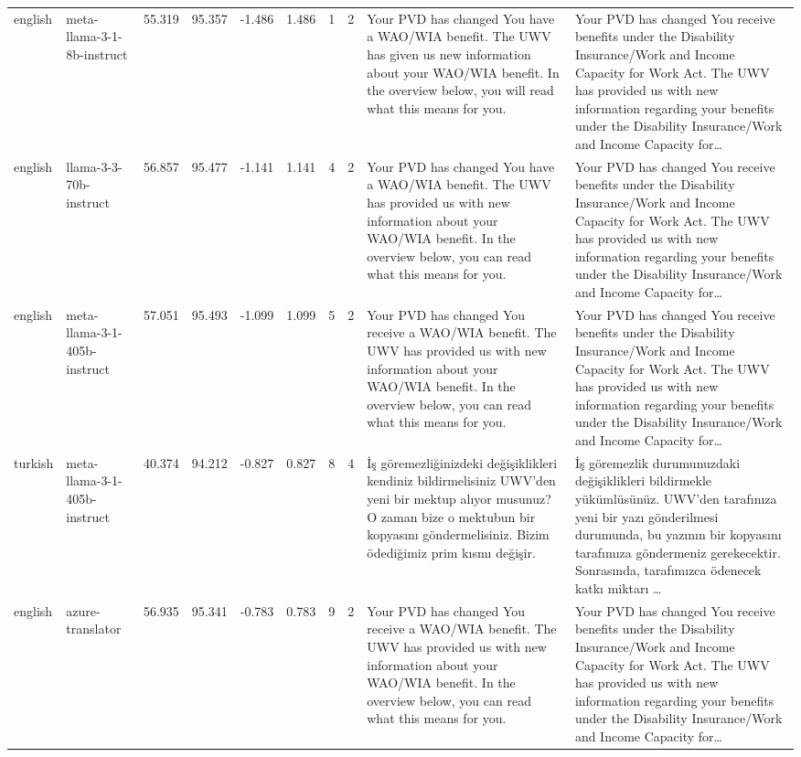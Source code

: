 \begin{tabular}{llrrrrrrll}
english & meta-llama-3-1-8b-instruct & 55.319 & 95.357 & -1.486 & 1.486 & 1 & 2 & Your PVD has changed You have a WAO/WIA benefit. The UWV has given us new information about your WAO/WIA benefit. In the overview below, you will read what this means for you. & Your PVD has changed You receive benefits under the Disability Insurance/Work and Income Capacity for Work Act. The UWV has provided us with new information regarding your benefits under the Disability Insurance/Work and Income Capacity for… \\
english & llama-3-3-70b-instruct & 56.857 & 95.477 & -1.141 & 1.141 & 4 & 2 & Your PVD has changed You have a WAO/WIA benefit. The UWV has provided us with new information about your WAO/WIA benefit. In the overview below, you can read what this means for you. & Your PVD has changed You receive benefits under the Disability Insurance/Work and Income Capacity for Work Act. The UWV has provided us with new information regarding your benefits under the Disability Insurance/Work and Income Capacity for… \\
english & meta-llama-3-1-405b-instruct & 57.051 & 95.493 & -1.099 & 1.099 & 5 & 2 & Your PVD has changed You receive a WAO/WIA benefit. The UWV has provided us with new information about your WAO/WIA benefit. In the overview below, you can read what this means for you. & Your PVD has changed You receive benefits under the Disability Insurance/Work and Income Capacity for Work Act. The UWV has provided us with new information regarding your benefits under the Disability Insurance/Work and Income Capacity for… \\
turkish & meta-llama-3-1-405b-instruct & 40.374 & 94.212 & -0.827 & 0.827 & 8 & 4 & İş göremezliğinizdeki değişiklikleri kendiniz bildirmelisiniz UWV'den yeni bir mektup alıyor musunuz? O zaman bize o mektubun bir kopyasını göndermelisiniz. Bizim ödediğimiz prim kısmı değişir. & İş göremezlik durumunuzdaki değişiklikleri bildirmekle yükümlüsünüz. UWV'den tarafınıza yeni bir yazı gönderilmesi durumunda, bu yazının bir kopyasını tarafımıza göndermeniz gerekecektir. Sonrasında, tarafımızca ödenecek katkı miktarı … \\
english & azure-translator & 56.935 & 95.341 & -0.783 & 0.783 & 9 & 2 & Your PVD has changed You receive a WAO/WIA benefit. The UWV has provided us with new information about your WAO/WIA benefit. In the overview below, you can read what this means for you. & Your PVD has changed You receive benefits under the Disability Insurance/Work and Income Capacity for Work Act. The UWV has provided us with new information regarding your benefits under the Disability Insurance/Work and Income Capacity for… \\
\bottomrule
\end{tabular}
